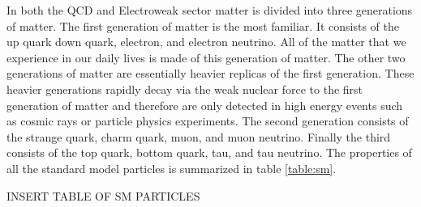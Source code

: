 In both the QCD and Electroweak sector matter is divided into three generations of matter.
The first generation of matter is the most familiar.
It consists of the up quark down quark, electron, and electron neutrino.
All of the matter that we experience in our daily lives is made of this generation of matter.
The other two generations of matter are essentially heavier replicas of the first generation.
These heavier generations rapidly decay via the weak nuclear force to the first generation of matter and therefore are only detected in high energy events such as cosmic rays or particle physics experiments.
The second generation consists of the strange quark, charm quark, muon, and muon neutrino.
Finally the third consists of the top quark, bottom quark, tau, and tau neutrino.
The properties of all the standard model particles is summarized in table \ref{table:sm}.

INSERT TABLE OF SM PARTICLES
